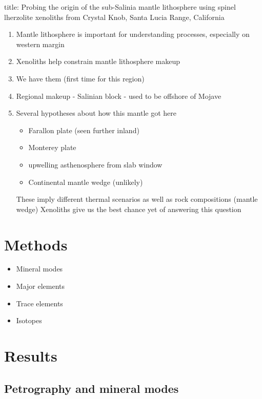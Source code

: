 title: Probing the origin of the sub-Salinia mantle lithosphere using
spinel lherzolite xenoliths from Crystal Knob, Santa Lucia Range,
California

\begin{enumerate}
\def\labelenumi{\arabic{enumi}.}
\item
  Mantle lithosphere is important for understanding processes,
  especially on western margin
\item
  Xenoliths help constrain mantle lithosphere makeup
\item
  We have them (first time for this region)
\item
  Regional makeup - Salinian block - used to be offshore of Mojave
\item
  Several hypotheses about how this mantle got here

  \begin{itemize}
  \itemsep1pt\parskip0pt
  \item
    Farallon plate (seen further inland)
  \item
    Monterey plate
  \item
    upwelling asthenosphere from slab window
  \item
    Continental mantle wedge (unlikely)
  \end{itemize}

  These imply different thermal scenarios as well as rock compositions
  (mantle wedge) Xenoliths give us the best chance yet of answering this
  question
\end{enumerate}

\section{Methods}\label{methods}

\begin{itemize}
\itemsep1pt\parskip0pt
\item
  Mineral modes
\item
  Major elements
\item
  Trace elements
\item
  Isotopes
\end{itemize}

\section{Results}\label{results}

\subsection{Petrography and mineral
modes}\label{petrography-and-mineral-modes}

